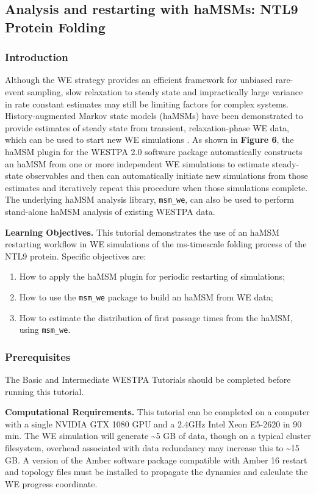 \subsection{Analysis and restarting with haMSMs: NTL9 Protein Folding}

\subsubsection{Introduction}
Although the WE strategy provides an efficient framework for unbiased rare-event sampling, slow relaxation to steady state and impractically large variance in rate constant estimates may still be limiting factors for complex systems.
History-augmented Markov state models (haMSMs) have been demonstrated to provide estimates of steady state from transient, relaxation-phase WE data, which can be used to start new WE simulations \citep{copperman_accelerated_2020}. 
As shown in \textbf{Figure 6}, the haMSM plugin for the WESTPA 2.0 software package automatically constructs an haMSM from one or more independent WE simulations to estimate steady-state observables and then can automatically initiate new simulations from those estimates and iteratively repeat this procedure when those simulations complete. 
The underlying haMSM analysis library, \verb|msm_we|, can also be used to perform stand-alone haMSM analysis of existing WESTPA data.

\textbf{Learning Objectives.}  This tutorial demonstrates the use of an haMSM restarting workflow in WE simulations of the ms-timescale folding process of the NTL9 protein. 
Specific objectives are:
\begin{enumerate}
    \item How to apply the haMSM plugin for periodic restarting of simulations;
    \item How to use the \verb|msm_we| package to build an haMSM from WE data;
    \item How to estimate the distribution of first passage times from the haMSM, using \verb|msm_we|.
\end{enumerate}

\subsubsection{Prerequisites} The Basic and Intermediate WESTPA Tutorials \citep{bogetti_suite_2019} should be completed before running this tutorial.

\textbf{Computational Requirements.} This tutorial can be completed on a computer with a single NVIDIA GTX 1080 GPU and a 2.4GHz Intel Xeon E5-2620 in 90 min. 
The WE simulation will generate \textasciitilde5 GB of data, though on a typical cluster filesystem, overhead associated with data redundancy may increase this to \textasciitilde15 GB. 
A version of the Amber software package compatible with Amber 16 restart and topology files must be installed to propagate the dynamics and calculate the WE progress coordinate. 


